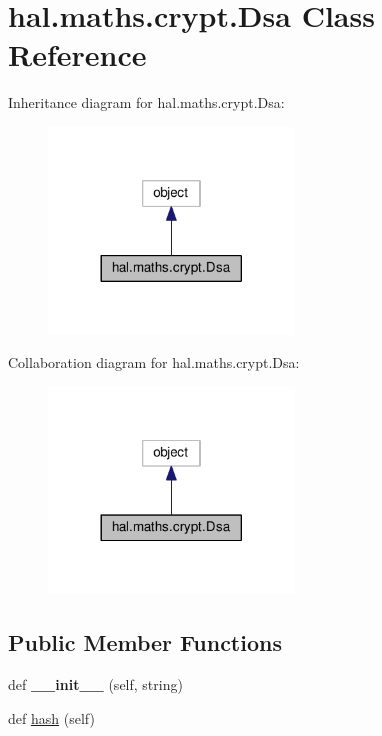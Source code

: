 \hypertarget{classhal_1_1maths_1_1crypt_1_1_dsa}{}\section{hal.\+maths.\+crypt.\+Dsa Class Reference}
\label{classhal_1_1maths_1_1crypt_1_1_dsa}


Inheritance diagram for hal.\+maths.\+crypt.\+Dsa\+:
\nopagebreak
\begin{figure}[H]
\begin{center}
\leavevmode
\includegraphics[width=185pt]{classhal_1_1maths_1_1crypt_1_1_dsa__inherit__graph}
\end{center}
\end{figure}


Collaboration diagram for hal.\+maths.\+crypt.\+Dsa\+:
\nopagebreak
\begin{figure}[H]
\begin{center}
\leavevmode
\includegraphics[width=185pt]{classhal_1_1maths_1_1crypt_1_1_dsa__coll__graph}
\end{center}
\end{figure}
\subsection*{Public Member Functions}
\begin{DoxyCompactItemize}
\item 
def {\bfseries \+\_\+\+\_\+init\+\_\+\+\_\+} (self, string)\hypertarget{classhal_1_1maths_1_1crypt_1_1_dsa_a127aadb2c49476c4ffc47537beb0a47f}{}\label{classhal_1_1maths_1_1crypt_1_1_dsa_a127aadb2c49476c4ffc47537beb0a47f}

\item 
def \hyperlink{classhal_1_1maths_1_1crypt_1_1_dsa_ab571cc724b6bd76e1001d9d449cb6c61}{hash} (self)
\end{DoxyCompactItemize}
